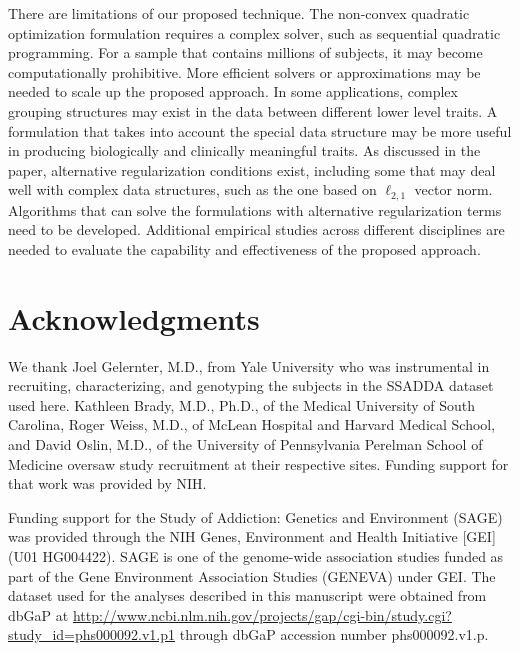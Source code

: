 \documentclass[10pt,letterpaper]{article}
\begin{document}
There are limitations of our proposed technique. The non-convex quadratic optimization formulation requires a complex solver, such as sequential quadratic programming. For a sample that contains millions of subjects, it may become computationally prohibitive. More efficient solvers or approximations may be needed to scale up the proposed approach. In some applications, complex grouping structures may exist in the data between different lower level traits. A formulation that takes into account the special data structure may be more useful in producing biologically and clinically meaningful traits. As discussed in the paper, alternative regularization conditions exist, including some that may deal well with complex data structures, such as the one based on $\ell_{2,1}$ vector norm. Algorithms that can solve the formulations with alternative regularization terms need to be developed. Additional empirical studies across different disciplines are needed to evaluate the capability and effectiveness of the proposed approach.

\section*{Acknowledgments}
 
We thank Joel Gelernter, M.D., from Yale University who was instrumental in
recruiting, characterizing, and genotyping the subjects in the SSADDA dataset used
here. Kathleen Brady, M.D., Ph.D., of the Medical University of South Carolina,
Roger Weiss, M.D., of McLean Hospital and Harvard Medical School, and David
Oslin, M.D., of the University of Pennsylvania Perelman School of Medicine
oversaw study recruitment at their respective sites. Funding support for that work was provided by NIH.

Funding support for the Study of Addiction: Genetics and Environment (SAGE) was provided through the NIH Genes, Environment and Health Initiative [GEI] (U01 HG004422). SAGE is one of the genome-wide association studies funded as part of the Gene Environment Association Studies (GENEVA) under GEI. The dataset used for the analyses described in this manuscript were obtained from dbGaP at \url{http://www.ncbi.nlm.nih.gov/projects/gap/cgi-bin/study.cgi?study_id=phs000092.v1.p1} through dbGaP accession number phs000092.v1.p.



\nolinenumbers

%
%
 
\end{document}
